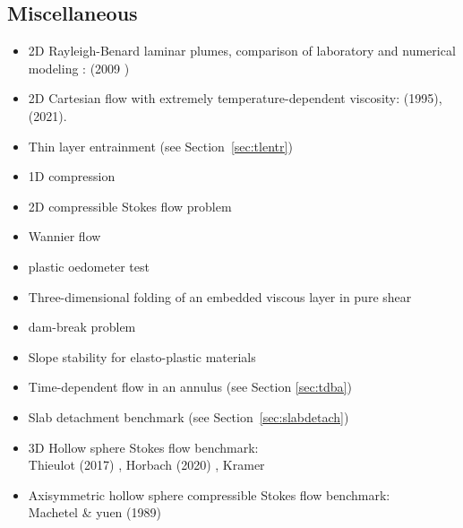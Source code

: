 \subsection{Miscellaneous}

\begin{itemize}

\item 2D Rayleigh-Benard laminar plumes, comparison of laboratory 
      and numerical modeling : 
      \textcite{vavl09} (2009
)
\item 2D Cartesian flow with extremely temperature-dependent viscosity:
      \textcite{moso95} (1995), \textcite{trbs21} (2021).

\item Thin layer entrainment (see Section~\ref{sec:tlentr})

\item 1D compression \cite{modm02}

\item 2D compressible Stokes flow problem \cite{itki94,tagu07,lezh08,kilv10,lizh13}

\item Wannier flow \cite{wann50,yemu99,cehg14}

\item plastic oedometer test  \cite{chtl13}

\item Three-dimensional folding of an embedded viscous layer in 
      pure shear \cite{flet91}

\item dam-break problem 
      \cite{moeb99,bacp07,liir07,lemx08,homa09,anco09,grdn97,hini81,basd08}

\item Slope stability for elasto-plastic materials \cite{rama16}

\item Time-dependent flow in an annulus \cite{galb19} (see Section \ref{sec:tdba})

\item Slab detachment benchmark (see Section~\ref{sec:slabdetach}) 

\item 3D Hollow sphere Stokes flow benchmark:\\
      Thieulot (2017) \cite{thie17},
      Horbach \etal (2020) \cite{homb20},
      Kramer \etal \cite{krdw21}

\item Axisymmetric hollow sphere compressible Stokes flow benchmark:\\
      Machetel \& yuen (1989) \cite{mayu89}


\end{itemize}
